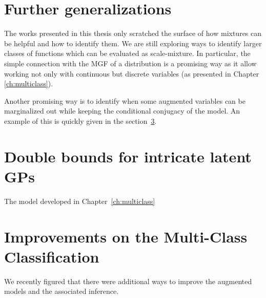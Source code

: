 

\graphicspath{{8/figures/}}


\section{Further generalizations}
The works presented in this thesis only scratched the surface of how mixtures can be helpful and how to identify them.
We are still exploring ways to identify larger classes of functions which can be evaluated as scale-mixture.
In particular, the simple connection with the \acf{MGF} of a distribution is a promising way as it allow working not only with continuous but discrete variables (as presented in Chapter \ref{ch:multiclass}).

Another promising way is to identify when some augmented variables can be marginalized out while keeping the conditional conjugacy of the model.
An example of this is quickly given in the section~\ref{sec:improve}.

\section{Double bounds for intricate latent \ac{GPs}}

The model developed in Chapter~\ref{ch:multiclass}



\section{Improvements on the Multi-Class Classification}
\label{sec:improve}
We recently figured that there were additional ways to improve the augmented models and the associated inference.



